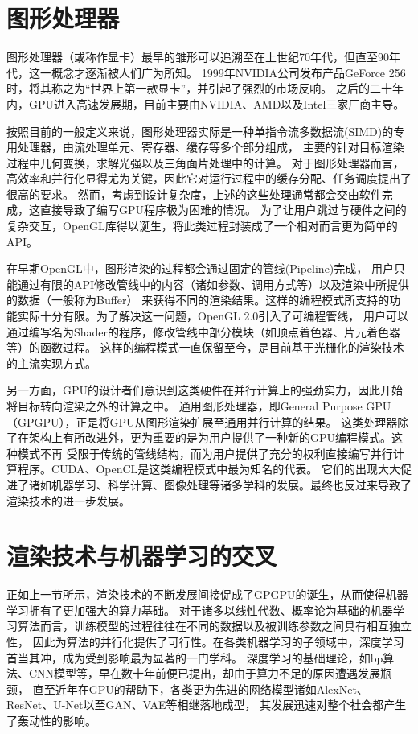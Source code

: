 \section{图形处理器}
图形处理器（或称作显卡）最早的雏形可以追溯至在上世纪70年代，但直至90年代，这一概念才逐渐被人们广为所知。
1999年NVIDIA公司发布产品GeForce 256时，将其称之为“世界上第一款显卡”\cite{firstGPU}，并引起了强烈的市场反响。
之后的二十年内，GPU进入高速发展期，目前主要由NVIDIA、AMD以及Intel三家厂商主导。

按照目前的一般定义来说，图形处理器实际是一种单指令流多数据流(SIMD)的专用处理器，由流处理单元、寄存器、缓存等多个部分组成，
主要的针对目标渲染过程中几何变换，求解光强以及三角面片处理中的计算。
对于图形处理器而言，高效率和并行化显得尤为关键，因此它对运行过程中的缓存分配、任务调度提出了很高的要求。
然而，考虑到设计复杂度，上述的这些处理通常都会交由软件完成，这直接导致了编写GPU程序极为困难的情况。
为了让用户跳过与硬件之间的复杂交互，OpenGL库得以诞生，将此类过程封装成了一个相对而言更为简单的API。

在早期OpenGL中，图形渲染的过程都会通过固定的管线(Pipeline)完成，
用户只能通过有限的API修改管线中的内容（诸如参数、调用方式等）以及渲染中所提供的数据（一般称为Buffer）
来获得不同的渲染结果。这样的编程模式所支持的功能实际十分有限。为了解决这一问题，OpenGL 2.0引入了可编程管线，
用户可以通过编写名为Shader的程序，修改管线中部分模块（如顶点着色器、片元着色器等）的函数过程。
这样的编程模式一直保留至今，是目前基于光栅化的渲染技术的主流实现方式。

另一方面，GPU的设计者们意识到这类硬件在并行计算上的强劲实力，因此开始将目标转向渲染之外的计算之中。
通用图形处理器，即General Purpose GPU（GPGPU），正是将GPU从图形渲染扩展至通用并行计算的结果。
这类处理器除了在架构上有所改进外，更为重要的是为用户提供了一种新的GPU编程模式。这种模式不再
受限于传统的管线结构，而为用户提供了充分的权利直接编写并行计算程序。CUDA、OpenCL是这类编程模式中最为知名的代表。
它们的出现大大促进了诸如机器学习、科学计算、图像处理等诸多学科的发展。最终也反过来导致了渲染技术的进一步发展。

\section{渲染技术与机器学习的交叉}

正如上一节所示，渲染技术的不断发展间接促成了GPGPU的诞生，从而使得机器学习拥有了更加强大的算力基础。
对于诸多以线性代数、概率论为基础的机器学习算法而言，训练模型的过程往往在不同的数据以及被训练参数之间具有相互独立性，
因此为算法的并行化提供了可行性。在各类机器学习的子领域中，深度学习首当其冲，成为受到影响最为显著的一门学科。
深度学习的基础理论，如bp算法、CNN模型等，早在数十年前便已提出，却由于算力不足的原因遭遇发展瓶颈，
直至近年在GPU的帮助下，各类更为先进的网络模型诸如AlexNet、ResNet、U-Net以至GAN、VAE等相继落地成型，
其发展迅速对整个社会都产生了轰动性的影响。

